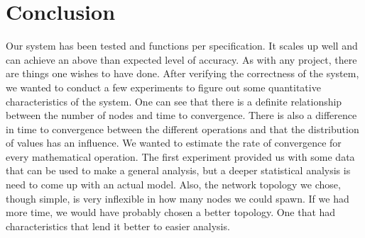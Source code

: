 \section{Conclusion}
Our system has been tested and functions per specification. It scales up well and can achieve an above than expected level of accuracy. 
As with any project, there are things one wishes to have done. After verifying the correctness of the system, we wanted to conduct a few experiments to figure out some quantitative characteristics of the system. One can see that there is a definite relationship between the number of nodes and time to convergence. There is also a difference in time to convergence between the different operations and that the distribution of values has an influence.  We wanted to estimate the rate of convergence for every mathematical operation. The first experiment provided us with some data that can be used to make a general analysis, but a deeper statistical analysis is need to come up with an actual model. Also, the network topology we chose, though simple, is very inflexible in how many nodes we could spawn. If we had more time, we would have probably chosen a better topology. One that had characteristics that lend it better to easier analysis.
